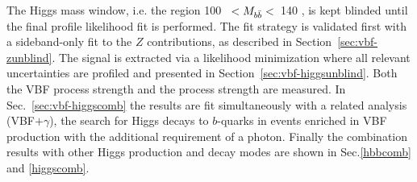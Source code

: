 The Higgs mass window, i.e. the region 100 \GeV~$< M_{b\bar{b}}<$~140 \GeV, is kept blinded until the final profile likelihood fit is performed.  The fit strategy is validated first with a sideband-only fit to the $Z$ contributions, as described in Section~\ref{sec:vbf-zunblind}. The signal is extracted via a likelihood minimization where all relevant uncertainties are profiled and presented in Section~\ref{sec:vbf-higgsunblind}. Both the VBF process strength and the \Hbb process strength are measured. In Sec.~\ref{sec:vbf-higgscomb} the results are fit simultaneously with a related analysis (VBF$+\gamma$), the search for Higgs decays to $b$-quarks in events enriched in VBF production with the additional requirement of a photon. Finally the combination results with other Higgs production and decay modes are shown in Sec.\ref{hbbcomb} and \ref{higgscomb}.







